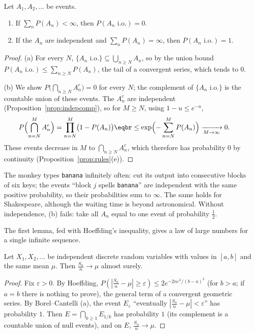 \begin{theorem}\label{thm:bc}
Let $A_1,A_2,\ldots$ be events.
\begin{enumerate}[label=(\alph*)]
\item If $\sum_nP(A_n)<\infty$, then $P(A_n\text{ i.o.})=0$.
\item If the $A_n$ are independent and $\sum_nP(A_n)=\infty$, then $P(A_n\text{ i.o.})=1$.
\end{enumerate}
\end{theorem}
\begin{proof}
(a) For every $N$, $\{A_n\text{ i.o.}\}\subseteq\bigcup_{n\ge N}A_n$, so by the union bound $P(A_n\text{ i.o.})\le\sum_{n\ge N}P(A_n)$, the tail of a
convergent series, which tends to $0$.

(b) We show $P\bigl(\bigcap_{n\ge N}A_n^c\bigr)=0$ for every $N$; the complement of $\{A_n\text{ i.o.}\}$ is the countable union of these events. The
$A_n^c$ are independent (Proposition~\ref{prop:indepcomp}), so for $M\ge N$, using $1-u\le e^{-u}$,
\[
\begin{aligned}P\Bigl(\bigcap_{n=N}^MA_n^c\Bigr)&=\prod_{n=N}^M\bigl(1-P(A_n)\bigr)\eqbr\le\exp\Bigl(-\sum_{n=N}^MP(A_n)\Bigr)\xrightarrow[M\to\infty]{}0.\end{aligned}
\]
These events decrease in $M$ to $\bigcap_{n\ge N}A_n^c$, which therefore has probability $0$ by continuity (Proposition~\ref{prop:rules}(e)).
\end{proof}

The monkey types \texttt{banana} infinitely often: cut its output into consecutive blocks of six keys; the events
``block $j$ spells \texttt{banana}'' are independent with the same positive probability, so their probabilities sum to $\infty$.
The same holds for Shakespeare, although the waiting time is beyond astronomical. Without independence, (b) fails:
take all $A_n$ equal to one event of probability $\frac12$.

The first lemma, fed with Hoeffding's inequality, gives a law of large numbers for a single infinite sequence.

\begin{corollary}\label{cor:slln}
Let $X_1,X_2,\ldots$ be independent discrete random variables with values in $[a,b]$ and the same mean $\mu$. Then
$\frac{S_n}n\to\mu$ almost surely.
\end{corollary}
\begin{proof}
Fix $\varepsilon>0$. By Hoeffding, $P(|\frac{S_n}n-\mu|\ge\varepsilon)\le2e^{-2n\varepsilon^2/(b-a)^2}$ (for $b>a$; if $a=b$ there is nothing to prove), the
general term of a convergent geometric series. By Borel--Cantelli (a), the event $E_\varepsilon$ ``eventually $|\frac{S_n}n-\mu|<\varepsilon$'' has
probability $1$. Then $E=\bigcap_{k\ge1}E_{1/k}$ has probability $1$ (its complement is a countable union of null events), and on $E$,
$\frac{S_n}n\to\mu$.
\end{proof}

